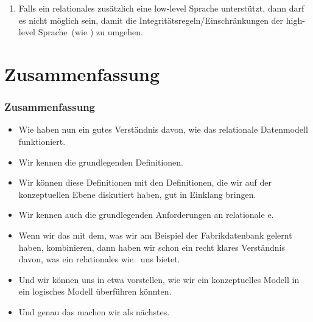 \documentclass[aspectratio=169,mathserif,notheorems]{beamer}%
\begin{document}
\begin{frame}[t]
\begin{enumerate}
{\begin{itemize}
%
\item<44-> \emph{Wenn} es das unterstützt, dann darf das keinen Einfluss auf die -Programme haben, die auf es zugreifen.%
%
\item<45-> In diesem Fall muss das  die Anfragen auf die entsprechenden Knoten verteilen und die Ergebnisse wieder zusammensetzen.%
%
\item<46-> Wenn ein  verteiltes Speichern nicht unterstützt, dann erfüllt es diese Bedingung automatisch.%
\end{itemize}%
}%
%
\setcounter{enumi}{11}%
\item<47-> Falls ein relationales  zusätzlich eine low-level Sprache unterstützt, dann darf es nicht möglich sein, damit die Integritätsregeln/Einschränkungen der high-level Sprache~(wie ) zu umgehen.
%
\end{enumerate}%
%
%
\end{frame}%
%
\section{Zusammenfassung}%
%
\begin{frame}%
\frametitle{Zusammenfassung}%
\begin{itemize}%
\item Wie haben nun ein gutes Verständnis davon, wie das relationale Datenmodell funktioniert.%
%
\item<2-> Wir kennen die grundlegenden Definitionen.%
%
\item<3-> Wir können diese Definitionen mit den Definitionen, die wir auf der konzeptuellen Ebene diskutiert haben, gut in Einklang bringen.%
%
\item<4-> Wir kennen auch die grundlegenden Anforderungen an relationale e.%
%
\item<5-> Wenn wir das mit dem, was wir am Beispiel der Fabrikdatenbank gelernt haben, kombinieren, dann haben wir schon ein recht klares Verständnis davon, was ein relationales  wie \postgresql\ uns bietet.%
%
\item<6-> Und wir können uns in etwa vorstellen, wie wir ein konzeptuelles Modell in ein logisches Modell überführen könnten.%
%
\item<7-> Und genau das machen wir als nächstes.%
\end{itemize}%
\end{frame}%
%
\endPresentation%
\end{document}
